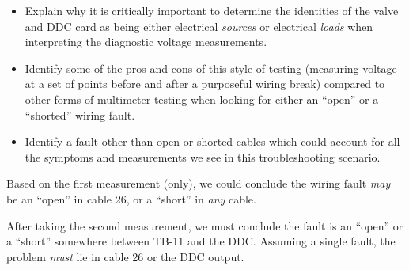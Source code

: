 \begin{itemize}
\item{} Explain why it is critically important to determine the identities of the valve and DDC card as being either electrical {\it sources} or electrical {\it loads} when interpreting the diagnostic voltage measurements.
\item{} Identify some of the pros and cons of this style of testing (measuring voltage at a set of points before and after a purposeful wiring break) compared to other forms of multimeter testing when looking for either an ``open'' or a ``shorted'' wiring fault.
\item{} Identify a fault other than open or shorted cables which could account for all the symptoms and measurements we see in this troubleshooting scenario.
\end{itemize}














Based on the first measurement (only), we could conclude the wiring fault {\it may} be an ``open'' in cable 26, or a ``short'' in {\it any} cable. 

\vskip 10pt

After taking the second measurement, we must conclude the fault is an ``open'' or a ``short'' somewhere between TB-11 and the DDC.  Assuming a single fault, the problem {\it must} lie in cable 26 or the DDC output.




